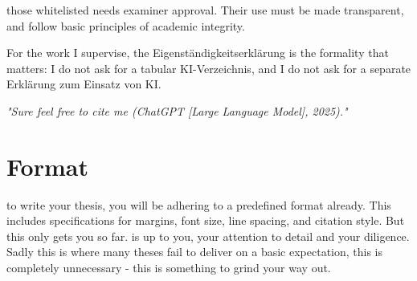 \documentclass{../sharedAssets/tufte}
\begin{document}
 those whitelisted needs examiner approval. Their use must be made transparent, and follow basic principles of academic integrity.

 For the work I supervise, the Eigenst\"andigkeitserkl\"arung is the formality that matters: I do not ask for a tabular KI-Verzeichnis, and I do not ask for a separate Erkl\"arung zum Einsatz von KI.

\textit{"Sure feel free to cite me (ChatGPT [Large Language Model], 2025)."}




  
 





\chapter{Format}

 to write your thesis, you will be adhering to a predefined format already.
This includes specifications for margins, font size, line spacing, and citation style. But this only gets you so far.
 is up to you, your attention to detail and your diligence. 
Sadly this is where many theses fail to deliver on a basic expectation, this is completely unnecessary - this is something to grind your way out.

\bigskip
\end{document}
